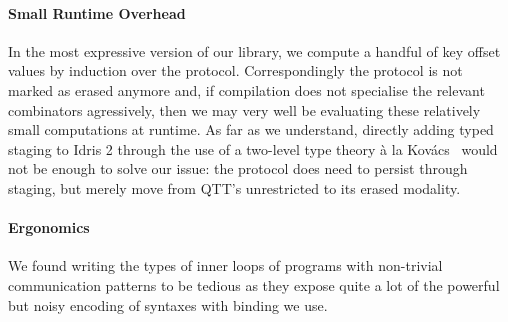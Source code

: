 \documentclass{easychair}
\begin{document}
\paragraph{Small Runtime Overhead}
In the most expressive version of our library, we compute a handful
of key offset values by induction over the protocol. Correspondingly
the protocol is not marked as erased anymore and, if compilation does
not specialise the relevant combinators agressively, then we may very
well be evaluating these relatively small computations at runtime.
%
As far as we understand, directly adding typed staging to Idris 2
through the use of a two-level type theory à la
Kov{\'{a}}cs~\cite{DBLP:journals/pacmpl/Kovacs22} would not be
enough to solve our issue: the protocol does need to persist
through staging, but merely move from QTT's unrestricted to its
erased modality.

\paragraph{Ergonomics}
We found writing the types of inner loops of programs with non-trivial
communication patterns to be tedious as they expose quite a lot of the
powerful but noisy encoding of syntaxes with binding we use.






%
%
%

\end{document}
